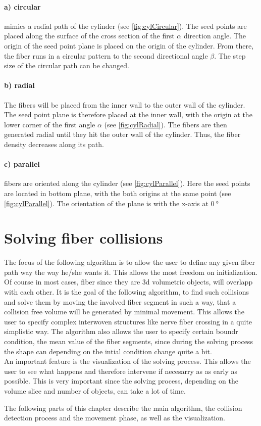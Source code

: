 \paragraph{a) circular} mimics a radial path of the cylinder (see \cref{fig:cylCircular}).
The seed points are placed along the surface of the cross section of the first $\alpha$ direction angle.
The origin of the seed point plane is placed on the origin of the cylinder.
From there, the fiber runs in a circular pattern to the second directional angle $\beta$.
The step size of the circular path can be changed.
%
\paragraph{b) radial} The fibers will be placed from the inner wall to the outer wall of the cylinder.
The seed point plane is therefore placed at the inner wall, with the origin at the lower corner of the first angle $\alpha$ (see \cref{fig:cylRadial}).
The fibers are then generated radial until they hit the outer wall of the cylinder.
Thus, the fiber density decreases along its path.
%
\paragraph{c) parallel} fibers are oriented along the cylinder (see \cref{fig:cylParallel}).
Here the seed points are located in bottom plane, with the both origins at the same point (see \cref{fig:cylParallel}). The orientation of the plane is with the x-axis at $\SI{0}{\degree}$
%
%
%
\section{Solving fiber collisions}
\label{sec:Solver}
%
%
The focus of the following algorithm is to allow the user to define any given fiber path way the way he/she wants it.
This allows the most freedom on initialization.
Of course in most cases, fiber since they are 3d volumetric objects, will overlapp with each other.
It is the goal of the following algorithm, to find such collisions and solve them by moving the involved fiber segment in such a way, that a collision free volume will be generated by minimal movement.
%
This allows the user to specify complex interwoven structures like nerve fiber crossing in a quite simplistic way.
%
The algorithm also allows the user to specify certain boundr condition, \eg{} the mean value of the fiber segments, since during the solving process the shape can depending on the intial condition change quite a bit.
\\
An important feature is the visualization of the solving process.
This allows the user to see what happens and therefore intervene if necesarry as as early as possible.
This is very important since the solving process, depending on the volume slice and number of objects, can take a lot of time.
\par
%
The following parts of this chapter describe the main algorithm, \ie{} the collision detection process and the movement phase, as well as the visualization.
%
%
